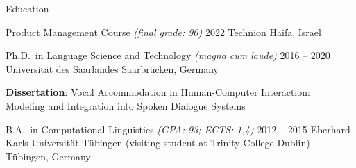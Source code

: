 \documentclass{resume} %
\begin{document}
\begin{rSection}{Education}
	
	\begin{rSubsection}
		{Product Management Course \footnotesize{\textit{(final grade: 90)}}}
		{2022}
		{Technion}
		{Haifa, Israel}
		
		\setlength{\itemindent}{.5cm}
		
		\item[]\vspace{-0.5cm}%
	\end{rSubsection}
	
	\begin{rSubsection}
		{Ph.D.\ in Language Science and Technology \footnotesize{\textit{(magna cum laude)}}}
		{2016 -- 2020}
		{Universität des Saarlandes}
		{Saarbrücken, Germany}
		
		\setlength{\itemindent}{.5cm}
		
		\item \textbf{Dissertation}: Vocal Accommodation in Human-Computer Interaction:\\\hspace*{2.9cm}Modeling and Integration into Spoken Dialogue Systems %
	\end{rSubsection}
	
	
	\begin{rSubsection}
		{B.A.\ in Computational Linguistics \footnotesize{\textit{(GPA: 93; ECTS: 1,4)}}}
		{2012 -- 2015}
		{Eberhard Karls Universität Tübingen (visiting student at Trinity College Dublin)}
		{Tübingen, Germany}
		

\end{rSubsection}
\end{rSection}
\end{document}
